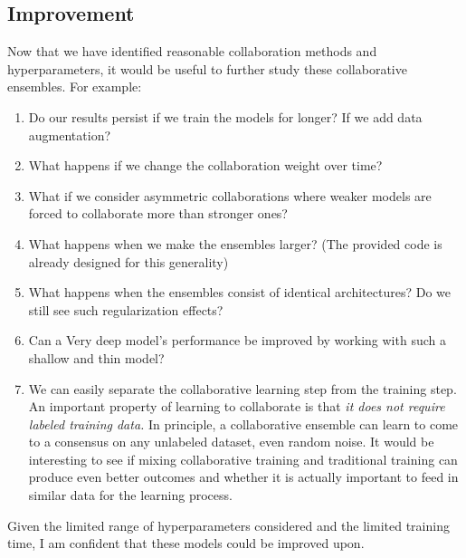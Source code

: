 \documentclass[english,a4paper,oneside]{amsart}
\theoremstyle{definition}
\begin{document}
\subsection{Improvement}
Now that we have identified reasonable collaboration methods and hyperparameters, it would be useful to further study these collaborative ensembles. For example:
\begin{enumerate}
	\item Do our results persist if we train the models for longer? If we add data augmentation?
	\item What happens if we change the collaboration weight over time? 
	\item What if we consider asymmetric collaborations where weaker models are forced to collaborate more than stronger ones?
	\item What happens when we make the ensembles larger? (The provided code is already designed for this generality)
	\item What happens when the ensembles consist of identical architectures? Do we still see such regularization effects?
	\item Can a Very deep model's performance be improved by working with such a shallow and thin model?
	\item We can easily separate the collaborative learning step from the training step. An important property of learning to collaborate is that \emph{it does not require labeled training data.} In principle, a collaborative ensemble can learn to come to a consensus on any unlabeled dataset, even random noise. It would be interesting to see if mixing collaborative training and traditional training can produce even better outcomes and whether it is actually important to feed in similar data for the learning process. 
\end{enumerate}

Given the limited range of hyperparameters considered and the limited training time, I am confident that these models could be improved upon. 

\end{document}

